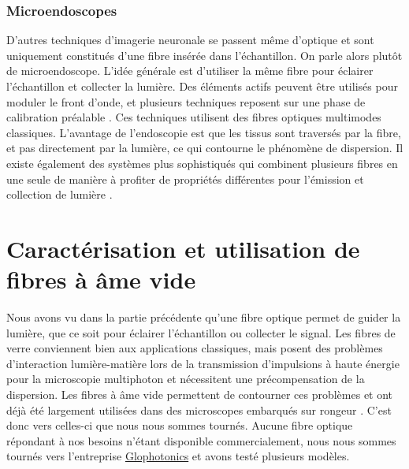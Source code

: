 \subsubsection{Microendoscopes}


D'autres techniques d'imagerie neuronale se passent même d'optique et sont uniquement constitués d'une fibre insérée dans l'échantillon. On parle alors plutôt de microendoscope. L'idée générale est d'utiliser la même fibre pour éclairer l'échantillon et collecter la lumière. Des éléments actifs peuvent être utilisés pour moduler le front d'onde, et plusieurs techniques reposent sur une phase de calibration préalable \cite{papadopoulos_high-resolution_2013}\cite{ohayon_minimally_2018}\cite{turtaev_high-fidelity_2018}. Ces techniques utilisent des fibres optiques multimodes classiques. L'avantage de l'endoscopie est que les tissus sont traversés par la fibre, et pas directement par la lumière, ce qui contourne le phénomène de dispersion. Il existe également des systèmes plus sophistiqués qui combinent plusieurs fibres en une seule de manière à profiter de propriétés différentes pour l'émission et collection de lumière \cite{andresen_two-photon_2013}\cite{kudlinski_double_2020}\cite{lombardini_high-resolution_2018}.



\section{Caractérisation et utilisation de fibres à âme vide}

Nous avons vu dans la partie précédente qu'une fibre optique permet de guider la lumière, que ce soit pour éclairer l'échantillon ou collecter le signal. Les fibres de verre conviennent bien aux applications classiques, mais posent des problèmes d'interaction lumière-matière lors de la transmission d'impulsions à haute énergie pour la microscopie multiphoton et nécessitent une précompensation de la dispersion. Les fibres à âme vide permettent de contourner ces problèmes et ont déjà été largement utilisées dans des microscopes embarqués sur rongeur \cite{tai_two-photon_2004} \cite{flusberg_vivo_2005} \cite{engelbrecht_ultra-compact_2008} \cite{piyawattanametha_vivo_2009} \cite{choi_improving_2014} \cite{klioutchnikov_three-photon_2020}. C'est donc vers celles-ci que nous nous sommes tournés. Aucune fibre optique répondant à nos besoins n'étant disponible commercialement, nous nous sommes tournés vers l'entreprise \href{http://www.glophotonics.fr/}{Glophotonics} et avons testé plusieurs modèles.

